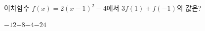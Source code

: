 이차함수 $f(x)=2(x-1)^2-4$에서 $3f(1)+f(-1)$의 값은?
\begin{choices32}{$-12$}{$-8$}{$-4$}{$-2$}{$4$}\end{choices32}
